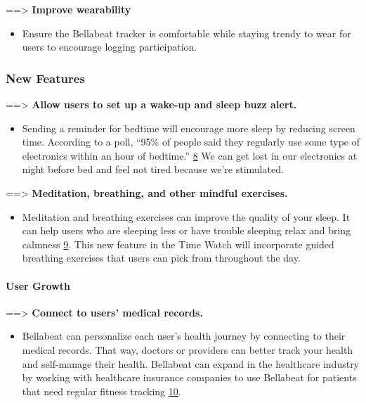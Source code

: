 \documentclass[
]{article}
\providecommand{\tightlist}{%
  \setlength{\itemsep}{0pt}\setlength{\parskip}{0pt}}
\begin{document}
==\textgreater{} \textbf{Improve wearability}

\begin{itemize}
\tightlist
\item
  Ensure the Bellabeat tracker is comfortable while staying trendy to
  wear for users to encourage logging participation.
\end{itemize}

\hypertarget{new-features}{%
\subsubsection{New Features}\label{new-features}}

==\textgreater{} \textbf{Allow users to set up a wake-up and sleep buzz
alert.}

\begin{itemize}
\tightlist
\item
  Sending a reminder for bedtime will encourage more sleep by reducing
  screen time. According to a poll, ``95\% of people said they regularly
  use some type of electronics within an hour of bedtime.''
  \href{https://www.sleepfoundation.org/bedroom-environment/technology-in-the-bedroom}{8}
  We can get lost in our electronics at night before bed and feel not
  tired because we're stimulated.
\end{itemize}

==\textgreater{} \textbf{Meditation, breathing, and other mindful
exercises.}

\begin{itemize}
\tightlist
\item
  Meditation and breathing exercises can improve the quality of your
  sleep. It can help users who are sleeping less or have trouble
  sleeping relax and bring calmness
  \href{https://www.sleepfoundation.org/insomnia/treatment/meditation}{9}.
  This new feature in the Time Watch will incorporate guided breathing
  exercises that users can pick from throughout the day.
\end{itemize}

\hypertarget{user-growth}{%
\paragraph{User Growth}\label{user-growth}}

==\textgreater{} \textbf{Connect to users' medical records.}

\begin{itemize}
\tightlist
\item
  Bellabeat can personalize each user's health journey by connecting to
  their medical records. That way, doctors or providers can better track
  your health and self-manage their health. Bellabeat can expand in the
  healthcare industry by working with healthcare insurance companies to
  use Bellabeat for patients that need regular fitness tracking
  \href{https://www.ncbi.nlm.nih.gov/pmc/articles/PMC6746089/}{10}.
\end{itemize}
\end{document}
